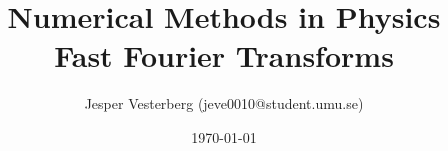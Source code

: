 \title{Numerical Methods in Physics \\ Fast Fourier Transforms}
\author{Jesper Vesterberg (jeve0010@student.umu.se)}
\date{\today}

\begin{titlepage}
  \maketitle
  \thispagestyle{fancy}
  \rhead{\today}
\end{titlepage}

